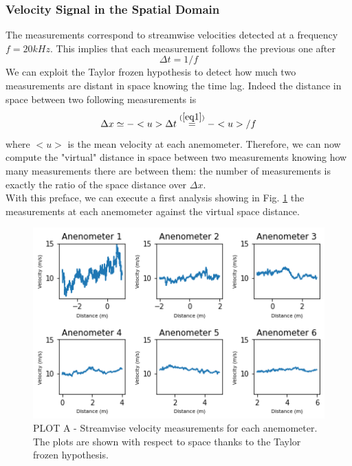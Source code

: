 \documentclass[11pt,titlepage]{article}
\begin{document}
\subsubsection{Velocity Signal in the Spatial Domain}\label{velocity_signal_in_the_spatial_domain}
The measurements correspond to streamwise velocities detected at a frequency $f=20kHz$. This implies that each measurement follows the previous one after 
\begin{equation} \label{eq1}
\Delta t = 1/f
\end{equation}
We can exploit the Taylor frozen hypothesis to detect how much two measurements are distant in space knowing the time lag. Indeed the distance in space between two following measurements is
\begin{equation} \label{eq2}
	\Delta x \simeq - <u> \Delta t \overset{(\ref{eq1})}{=} -<u>/f
\end{equation}
	where $<u>$ is the mean velocity at each anemometer. Therefore, we can now compute the "virtual" distance in space between two measurements knowing how many measurements there are between them: the number of measurements is exactly the ratio of the space distance over $\Delta x$. \\
With this preface, we can execute a first analysis showing in Fig. \ref{fig1} the measurements at each anemometer against the virtual space distance. \\

	\begin{center}
	\begin{figure} [h]
		\centering
		\includegraphics[width = 4.5in]{./figures/ex1_1.png}
		\caption{PLOT A - Streamvise velocity measurements for each anemometer. The plots are shown with respect to space thanks to the Taylor frozen hypothesis.}
		\label{fig1}
	\end{figure}
\end{center}
\end{document}
